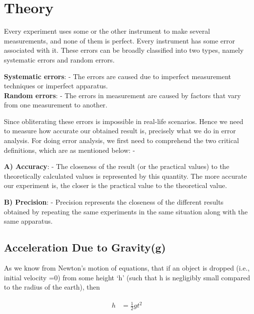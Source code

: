 \documentclass[11pt]{scrartcl} %
\begin{document}
\section{Theory}
Every experiment uses some or the other instrument to make several measurements, and none of them is perfect. Every instrument has some error associated with it. These errors can be broadly classified into two types, namely systematic errors and random errors.\par 
\textbf{Systematic errors}: - The errors are caused due to imperfect measurement techniques or imperfect apparatus. \\
\textbf{Random errors}: - The errors in measurement are caused by factors that vary from one measurement to another. \par 

Since obliterating these errors is impossible in real-life scenarios. Hence we need to measure how accurate our obtained result is, precisely what we do in error analysis. For doing error analysis, we first need to comprehend the two critical definitions, which are as mentioned below: - \par 

\textbf{A) Accuracy}: - The closeness of the result (or the practical values) to the theoretically calculated values is represented by this quantity. The more accurate our experiment is, the closer is the practical value to the theoretical value.\par

\textbf{B) Precision}: - Precision represents the closeness of the different results obtained by repeating the same experiments in the same situation along with the same apparatus. \par

\subsection{Acceleration Due to Gravity(g)}

As we know from Newton’s motion of equations, that if an object is dropped (i.e., initial velocity =0) from some height ‘h’ (such that h is negligibly small compared to the radius of the earth), then  \par

\begin{align} 
	\begin{split}
		h &= \frac{1}{2}gt^2\\
	\end{split}					
\end{align}
\end{document}
